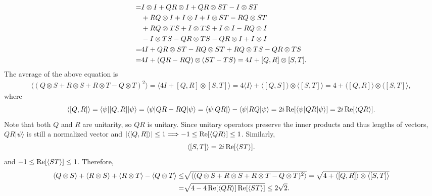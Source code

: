 \documentclass[en]{sol-man}
\begin{document}
\begin{pf}
\begin{align}
        \notag=&I\otimes I+QR\otimes I+QR\otimes ST-I\otimes ST\\
        \notag&+RQ\otimes I+I\otimes I+I\otimes ST-RQ\otimes ST\\
        \notag&+RQ\otimes TS+I\otimes TS+I\otimes I-RQ\otimes I\\
        \notag&-I\otimes TS-QR\otimes TS-QR\otimes I+I\otimes I\\
        \notag=&4I+QR\otimes ST-RQ\otimes ST+RQ\otimes TS-QR\otimes TS\\
        =&4I+(QR-RQ)\otimes(ST-TS)=4I+[Q,R]\otimes[S,T].
    \end{align}
    The average of the above equation is
    \begin{align}
        \langle(Q\otimes S+R\otimes S+R\otimes T-Q\otimes T)^2\rangle=\langle 4I+[Q,R]\otimes[S,T]\rangle=4\langle I\rangle+\langle[Q,S]\rangle\otimes\langle[S,T]\rangle=4+\langle[Q,R]\rangle\otimes\langle[S,T]\rangle,
    \end{align}
    where
    \begin{align}
        \langle[Q,R]\rangle=\langle\psi\rvert[Q,R]\lvert\psi\rangle=\langle\psi\rvert QR-RQ\lvert\psi\rangle=\langle\psi\rvert QR\lvert\rangle-\langle\psi\rvert RQ\lvert\psi\rangle=2i\operatorname{Re}[\langle\psi\rvert QR\lvert\psi\rangle]=2i\operatorname{Re}[\langle QR\rangle].
    \end{align}
    Note that both $Q$ and $R$ are unitarity, so $QR$ is unitary. Since unitary operators preserve the inner products and thus lengths of vectors, $QR\lvert\psi\rangle$ is still a normalized vector and $\left\lvert\langle[Q,R]\rangle\right\rvert\leq 1\Longrightarrow-1\leq\operatorname{Re}[\langle QR\rangle]\leq 1$.
    Similarly,
    \begin{align}
        \langle[S,T]\rangle=2i\operatorname{Re}[\langle ST\rangle].
    \end{align}
    and $-1\leq\operatorname{Re}[\langle ST\rangle]\leq 1$.
    Therefore,
    \begin{align}
        \notag\langle Q\otimes S\rangle+\langle R\otimes S\rangle+\langle R\otimes T\rangle-\langle Q\otimes T\rangle\leq&\sqrt{\langle(Q\otimes S+R\otimes S+R\otimes T-Q\otimes T)^2\rangle}=\sqrt{4+\langle[Q,R]\rangle\otimes\langle[S,T]\rangle}\\
        =&\sqrt{4-4\operatorname{Re}[\langle QR\rangle]\operatorname{Re}[\langle ST\rangle]}\leq 2\sqrt{2}.
    \end{align}
\end{pf}

\ifx\allfiles\undefined


\end{document}
